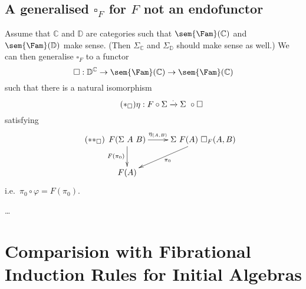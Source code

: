 \documentclass{article}
\begin{document}
\subsection{A generalised $\square_F$ for $F$ not an endofunctor}

Assume that $\mathbb{C}$ and $\mathbb{D}$ are categories such that
$\sem{\Fam}({\mathbb{C}})$ and $\sem{\Fam}({\mathbb{D}})$ make
sense. (Then $\Sigma_{\mathbb{C}}$ and $\Sigma_{\mathbb{D}}$ should
make sense as well.) We can then generalise $\square_F$ to a functor
\[
\square : \mathbb{D}^{\mathbb{C}} \to \sem{\Fam}(\mathbb{C}) \to \sem{\Fam}(\mathbb{C})
\]
such that there is a natural isomorphism
\begin{equation}
  \label{eq:square}
  \tag{$\ast_{\square}$}
\eta : F \circ \Sigma \xrightarrow{\cdot} \Sigma\ \circ \square
\end{equation}
satisfying
\begin{equation}
  \label{eq:square2}
  \tag{$\ast\ast_{\square}$}
\xymatrix
{
F(\Sigma\ A\ B) \ar^-{\eta_{(A, B)}}[r] \ar_{F(\pi_0)}[d] & \Sigma\ F(A)\ \square_F(A, B) \ar^{\pi_0}[dl] \\
F(A)  & 
}
\end{equation}
i.e.\ $\pi_0 \circ \varphi = F(\pi_0)$.

\ldots

\section{Comparision with Fibrational Induction Rules for Initial Algebras}
\end{document}
